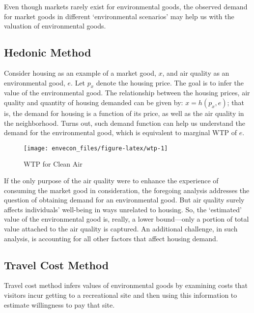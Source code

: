 \documentclass[
]{book}
\begin{document}
Even though markets rarely exist for environmental goods, the observed demand for market goods in different `environmental scenarios' may help us with the valuation of environmental goods.

\hypertarget{hedonic-method}{%
\subsection{Hedonic Method}\label{hedonic-method}}

Consider housing as an example of a market good, \(x\), and air quality as an environmental good, \(e\). Let \(p_x\) denote the housing price. The goal is to infer the value of the environmental good. The relationship between the housing prices, air quality and quantity of housing demanded can be given by: \(x=h(p_x,e)\); that is, the demand for housing is a function of its price, as well as the air quality in the neighborhood. Turns out, such demand function can help us understand the demand for the environmental good, which is equivalent to marginal WTP of \(e\).

\begin{figure}

{\centering \texttt{[image: envecon\_files/figure-latex/wtp-1]} 

}

\caption{WTP for Clean Air}\label{fig:wtp}
\end{figure}

If the only purpose of the air quality were to enhance the experience of consuming the market good in consideration, the foregoing analysis addresses the question of obtaining demand for an environmental good. But air quality surely affects individuals' well-being in ways unrelated to housing. So, the `estimated' value of the environmental good is, really, a lower bound---only a portion of total value attached to the air quality is captured. An additional challenge, in such analysis, is accounting for all other factors that affect housing demand.

\hypertarget{travel-cost-method}{%
\subsection{Travel Cost Method}\label{travel-cost-method}}

Travel cost method infers values of environmental goods by examining costs that visitors incur getting to a recreational site and then using this information to estimate willingness to pay that site.
\end{document}
